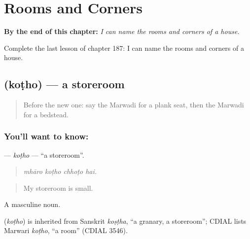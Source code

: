
\chapter{Rooms and Corners}
\label{ch:mw-rooms-and-corners}

\begin{chapteropening}
\textbf{By the end of this chapter:} \emph{I can name the rooms and corners of a house.}

Complete the last lesson of chapter 187: I can name the rooms and corners of a house.
\end{chapteropening}

\section[\texorpdfstring{\mw{कोठो} (koṭho)}{कोठो (koṭho)}]{ (koṭho) — a storeroom}

\label{lesson:MW-C187-kotho}



\begin{quote}
Before the new one: say the Marwadi for a plank seat, then the Marwadi for a bedstead.
\end{quote}

\subsection*{You'll want to know: }
\textbf{} — \emph{koṭho} — \textquotedblleft{}a storeroom\textquotedblright{}.

\begin{quote}
   
\end{quote}

\begin{quote}
\emph{mhāro koṭho chhoṭo hai.}
\end{quote}

\begin{quote}
My storeroom is small.
\end{quote}

A masculine noun.

\begin{cousinweb}
\textbf{} (\emph{koṭho}) is inherited from Sanskrit \emph{koṣṭha}, \textquotedblleft{}a granary, a storeroom\textquotedblright{}; CDIAL lists Marwari \emph{koṭho}, \textquotedblleft{}a room\textquotedblright{} (CDIAL 3546).
\end{cousinweb}

